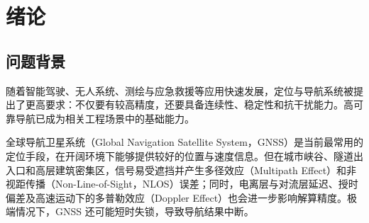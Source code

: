 \chapter{绪论}
\label{cha:intro}






\section{问题背景}

随着智能驾驶、无人系统、测绘与应急救援等应用快速发展，定位与导航系统被提出了更高要求：不仅要有较高精度，还要具备连续性、稳定性和抗干扰能力。高可靠导航已成为相关工程场景中的基础能力。

全球导航卫星系统（Global Navigation Satellite System，GNSS）是当前最常用的定位手段，在开阔环境下能够提供较好的位置与速度信息。但在城市峡谷、隧道出入口和高层建筑密集区，信号易受遮挡并产生多径效应（Multipath Effect）和非视距传播（Non-Line-of-Sight，NLOS）误差；同时，电离层与对流层延迟、授时偏差及高速运动下的多普勒效应（Doppler Effect）也会进一步影响解算精度。极端情况下，GNSS 还可能短时失锁，导致导航结果中断。

